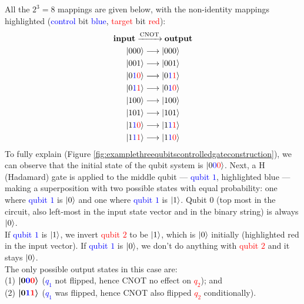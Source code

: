 \documentclass[conference]{IEEEtran}
\begin{document}
\begin{appendices}
All the $2^3=8$ mappings are given below, with the non-identity mappings highlighted
(\textcolor{blue}{control} bit \textcolor{blue}{blue}, \textcolor{red}{target} bit \textcolor{red}{red}):
\begin{gather*}
    \text{\textbf{input}} \xrightarrow{\text{CNOT}} \text{\textbf{output}} \\
    \ket{000} \longrightarrow \ket{000} \\
    \ket{001} \longrightarrow \ket{001} \\
    \ket{0\textcolor{blue}{1}\textcolor{red}{0}} \longrightarrow \ket{0\textcolor{blue}{1}\textcolor{red}{1}} \\
    \ket{0\textcolor{blue}{1}\textcolor{red}{1}} \longrightarrow \ket{0\textcolor{blue}{1}\textcolor{red}{0}} \\
    \ket{100} \longrightarrow \ket{100} \\
    \ket{101} \longrightarrow \ket{101} \\
    \ket{1\textcolor{blue}{1}\textcolor{red}{0}} \longrightarrow \ket{1\textcolor{blue}{1}\textcolor{red}{1}} \\
    \ket{1\textcolor{blue}{1}\textcolor{red}{1}} \longrightarrow \ket{1\textcolor{blue}{1}\textcolor{red}{0}} \\
\end{gather*}
To fully explain (Figure \ref{fig:examplethreequbitscontrolledgateconstruction}),
we can observe that the initial state of the qubit system is $\ket{0\textcolor{blue}{0}\textcolor{red}{0}}$.
Next, a H (Hadamard) gate is applied to the middle qubit — \textcolor{blue}{qubit $1$}, highlighted blue —
making a superposition with two possible states with equal probability: one where \textcolor{blue}{qubit $1$} is $\ket{0}$
and one where \textcolor{blue}{qubit $1$} is $\ket{1}$. Qubit $0$ (top most in the circuit, also
left-most in the input state vector and in the binary string) is always $\ket{0}$. \\

If \textcolor{blue}{qubit $1$} is $\ket{1}$, we invert \textcolor{red}{qubit $2$} to be $\ket{1}$,
which is $\ket{0}$ initially
(highlighted red in the input vector). If \textcolor{blue}{qubit $1$} is $\ket{0}$,
we don't do anything with \textcolor{red}{qubit $2$} and it stays $\ket{0}$. \\

The only possible output states in this case are: \\
(1) $\boldsymbol{\ket{0\textcolor{blue}{0}\textcolor{red}{0}}}$ (\textcolor{blue}{$q_{1}$} not flipped,
hence CNOT no effect on \textcolor{red}{$q_{2}$}); and \\
(2) $\boldsymbol{\ket{0\textcolor{blue}{1}\textcolor{red}{1}}}$ (\textcolor{blue}{$q_{1}$} was flipped,
hence CNOT also flipped \textcolor{red}{$q_{2}$} conditionally).


\end{appendices}
\end{document}
